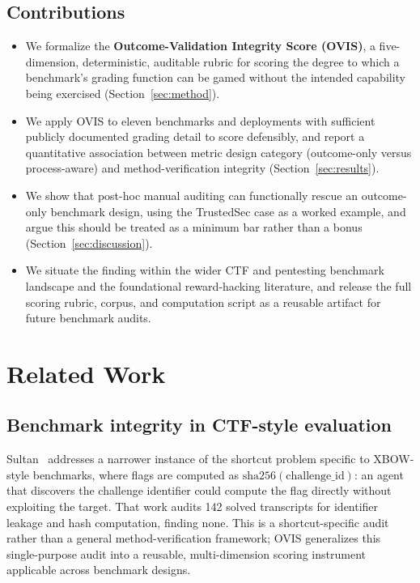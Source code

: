 \documentclass[10pt,twocolumn]{article}
\begin{document}
\subsection{Contributions}
\begin{itemize}[leftmargin=*,itemsep=1pt,topsep=2pt]
  \item We formalize the \textbf{Outcome-Validation Integrity Score
  (OVIS)}, a five-dimension, deterministic, auditable rubric for scoring
  the degree to which a benchmark's grading function can be gamed
  without the intended capability being exercised (Section~\ref{sec:method}).
  \item We apply OVIS to eleven benchmarks and deployments with
  sufficient publicly documented grading detail to score defensibly, and
  report a quantitative association between metric design category
  (outcome-only versus process-aware) and method-verification integrity
  (Section~\ref{sec:results}).
  \item We show that post-hoc manual auditing can functionally rescue an
  outcome-only benchmark design, using the TrustedSec case as a worked
  example, and argue this should be treated as a minimum bar rather than
  a bonus (Section~\ref{sec:discussion}).
  \item We situate the finding within the wider CTF and pentesting
  benchmark landscape and the foundational reward-hacking literature,
  and release the full scoring rubric, corpus, and computation script as
  a reusable artifact for future benchmark audits.
\end{itemize}

\section{Related Work}

\subsection{Benchmark integrity in CTF-style evaluation}
Sultan~\cite{xbow2026} addresses a narrower instance of the shortcut
problem specific to XBOW-style benchmarks, where flags are computed as
$\mathrm{sha256}(\mathrm{challenge\_id})$: an agent that discovers the
challenge identifier could compute the flag directly without exploiting
the target. That work audits 142 solved transcripts for identifier
leakage and hash computation, finding none. This is a shortcut-specific
audit rather than a general method-verification framework; OVIS
generalizes this single-purpose audit into a reusable, multi-dimension
scoring instrument applicable across benchmark designs.
\end{document}
